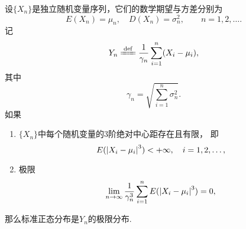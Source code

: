 \begin{theorem}[李雅普洛夫中心极限定理]
设\(\{X_n\}\)是独立随机变量序列，它们的数学期望与方差分别为\[
	E(X_n) = \mu_n, \quad
	D(X_n) = \sigma_n^2,
	\qquad n=1,2,\dotsc.
\]
记\[
	Y_n \defeq \frac{1}{\gamma_n} \sum_{i=1}^n (X_i-\mu_i),
\]
其中\[
	\gamma_n = \sqrt{\sum_{i=1}^n \sigma_n^2}.
\]
如果\begin{enumerate}
	\item \(\{X_n\}\)中每个随机变量的3阶绝对中心距存在且有限，
	即\[
		E(\abs{X_i-\mu_i}^3) < +\infty,
		\quad i=1,2,\dotsc,
	\]

	\item 极限\[
		\lim_{n\to\infty} \frac{1}{\gamma_n^3}
			\sum_{i=1}^n E(\abs{X_i-\mu_i}^3)
		= 0,
	\]
\end{enumerate}
那么标准正态分布是\(Y_n\)的极限分布.
\end{theorem}
